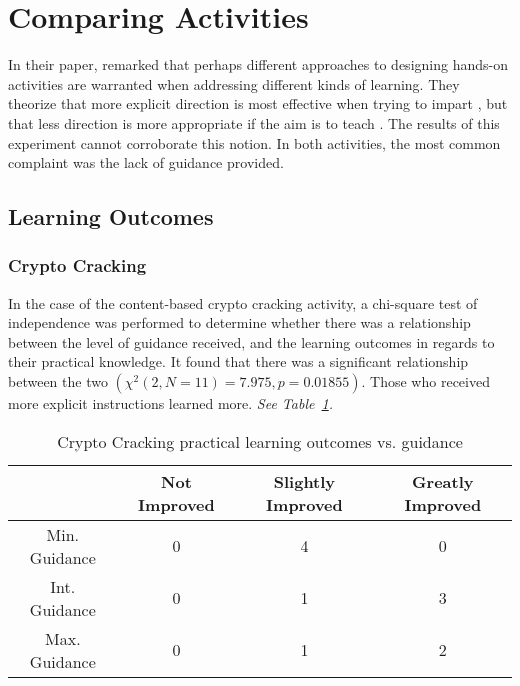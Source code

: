 \section{Comparing Activities}
    In their paper, \citeauthor{R-Weiss} remarked that perhaps different approaches to designing hands-on activities are warranted when addressing different kinds of learning. 
    They theorize that more explicit direction is most effective when trying to impart , but that less direction is more appropriate if the aim is to teach . 
    The results of this experiment cannot corroborate this notion. In both activities, the most common complaint was the lack of guidance provided. 
    
    \subsection{Learning Outcomes}

        \subsubsection*{Crypto Cracking}
            In the case of the content-based crypto cracking activity, a chi-square test of independence was performed to determine whether there was a relationship between the level of guidance received, and the learning outcomes in regards to their practical knowledge. 
            It found that there was a significant relationship between the two $(\chi^2(2, N=11)=7.975,  p = 0.01855)$. Those who received more explicit instructions learned more. \emph{See Table~\ref{tab:cc-pLO-v-g}.}

            \begin{table}
            \begin{center}
                \begin{tabular}{|c|c|c|c|}
                    \hline
                        & Not Improved & Slightly Improved & Greatly Improved \\
                    \hline
                    Min. Guidance & 0 & 4 & 0\\
                    \hline
                    Int. Guidance & 0 & 1 & 3\\
                    \hline
                    Max. Guidance & 0 & 1 & 2\\
                    \hline
                \end{tabular}

                \caption{Crypto Cracking practical learning outcomes vs. guidance}\label{tab:cc-pLO-v-g}
            \end{center}
            \end{table}

